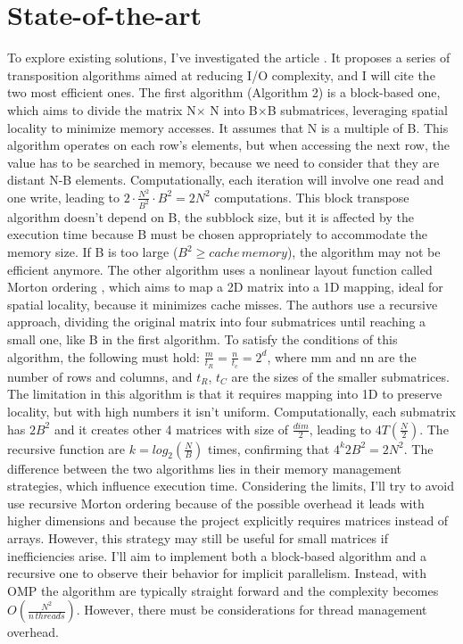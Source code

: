 \section{State-of-the-art}
To explore existing solutions, I’ve investigated the article \cite{cache_efficiency}. It proposes a series of transposition algorithms aimed at reducing I/O complexity, and I will cite the two most efficient ones.
The first algorithm (Algorithm 2) is a block-based one, which aims to divide the matrix N$\times$ N into B$\times$B submatrices, leveraging spatial locality to minimize memory accesses.
It assumes that N is a multiple of B. This algorithm operates on each row's elements, but when accessing the next row, the value has to be searched in memory, because we need to consider that they are distant N-B elements.
Computationally, each iteration will involve one read and one write, leading to $2\cdot \frac{N^2}{B^2}\cdot B^2=2N^2$ computations. This block transpose algorithm doesn't depend on B, the subblock size, but it is affected by the execution time because B must be chosen appropriately to accommodate the memory size. If B is too large ($B^2\geq cache\,memory$), the algorithm may not be efficient anymore.
The other algorithm uses a nonlinear layout function called Morton ordering \cite{morton_ordering}, which aims to map a 2D matrix into a 1D mapping, ideal for spatial locality, because it minimizes cache misses. The authors use a recursive approach, dividing the original matrix into four submatrices until reaching a small one, like B in the first algorithm. To satisfy the conditions of this algorithm, the following must hold: $\frac{m}{t_R}=\frac{n}{t_c}=2^d$, where mm and nn are the number of rows and columns, and $t_R$, $t_C$ are the sizes of the smaller submatrices.
The limitation in this algorithm is that it requires mapping into 1D to preserve locality, but with high numbers it isn't uniform. Computationally, each submatrix has $2B^2$ and it creates other 4 matrices with size of $\frac{dim}{2}$, leading to $4T(\frac{N}{2})$.
The recursive function are $k=log_2(\frac{N}{B})$ times, confirming that $4^k2B^2=2N^2$. %
The difference between the two algorithms lies in their memory management strategies, which influence execution time.
Considering the limits, I'll try to avoid use recursive Morton ordering because of the possible overhead it leads with higher dimensions and because the project explicitly requires matrices instead of arrays. However, this strategy may still be useful for small matrices if inefficiencies arise. I’ll aim to implement both a block-based algorithm and a recursive one to observe their behavior for implicit parallelism.
Instead, with OMP the algorithm are typically straight forward and the complexity becomes $O(\frac{N^2}{n\,threads})$. However, there must be considerations for thread management overhead.
